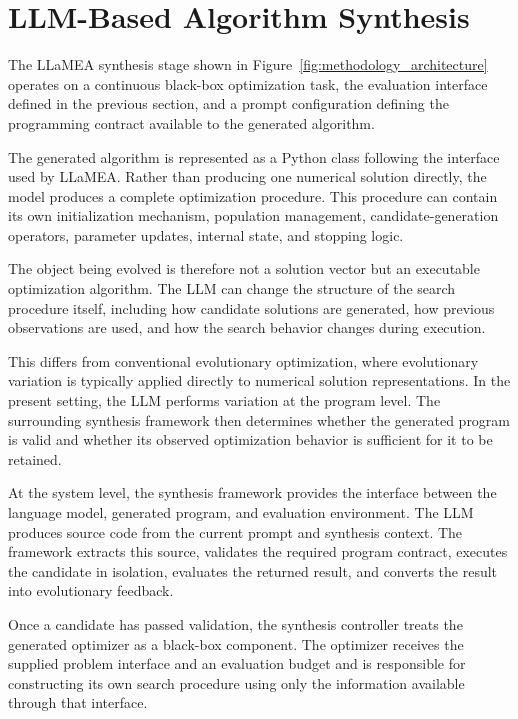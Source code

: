\section{LLM-Based Algorithm Synthesis}
\label{sec:llm_algorithm_synthesis}

The LLaMEA synthesis stage shown in
Figure~\ref{fig:methodology_architecture} operates on a continuous black-box
optimization task, the evaluation interface defined in the previous section,
and a prompt configuration defining the programming contract available to the
generated algorithm.

The generated algorithm is represented as a Python class following the
interface used by LLaMEA. Rather than producing one numerical solution
directly, the model produces a complete optimization procedure. This procedure
can contain its own initialization mechanism, population management,
candidate-generation operators, parameter updates, internal state, and
stopping logic.

The object being evolved is therefore not a solution vector but an executable
optimization algorithm. The LLM can change the structure of the search
procedure itself, including how candidate solutions are generated, how
previous observations are used, and how the search behavior changes during
execution.

This differs from conventional evolutionary optimization, where evolutionary
variation is typically applied directly to numerical solution
representations. In the present setting, the LLM performs variation at the
program level. The surrounding synthesis framework then determines whether
the generated program is valid and whether its observed optimization behavior
is sufficient for it to be retained.

At the system level, the synthesis framework provides the interface between
the language model, generated program, and evaluation environment. The LLM
produces source code from the current prompt and synthesis context. The
framework extracts this source, validates the required program contract,
executes the candidate in isolation, evaluates the returned result, and
converts the result into evolutionary feedback.

Once a candidate has passed validation, the synthesis controller treats the
generated optimizer as a black-box component. The optimizer receives the
supplied problem interface and an evaluation budget and is responsible for
constructing its own search procedure using only the information available
through that interface.

